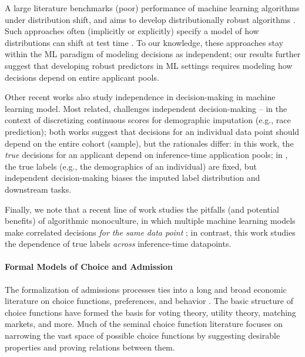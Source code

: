 \documentclass[letterpaper]{article}
\begin{document}
A large literature benchmarks (poor) performance of machine learning algorithms under distribution shift, and aims to develop distributionally robust algorithms \citep{gardner2023benchmarking,koh2021wilds,yao2022wild}. Such approaches often (implicitly or explicitly) specify a model of how distributions can shift at test time \cite{kaurmodeling}. To our knowledge, these approaches stay within the ML paradigm of modeling decisions as independent; our results further suggest that developing robust predictors in ML settings requires modeling how decisions depend on entire applicant pools.

Other recent works also study independence in decision-making in machine learning model. Most related, \citet{dongdiscretization2025} challenges independent decision-making -- in the context of discretizing continuous scores for demographic imputation (e.g., race prediction); both works suggest that decisions for an individual data point should depend on the entire cohort (sample), but the rationales differ: in this work, the \textit{true} decisions for an applicant depend on inference-time application pools; in \citet{dongdiscretization2025}, the true labels (e.g., the demographics of an individual) are fixed, but independent decision-making biases the imputed label distribution and downstream tasks.

Finally, we note that a recent line of work studies the pitfalls (and potential benefits) of algorithmic monoculture, in which multiple machine learning models make correlated decisions \textit{for the same data point} \cite{kleinberg2021algorithmic,bommasani2022pickingpersondoesalgorithmic, creel2022algorithmic, toups2023ecosystem, jain2023algorithmic,peng2024monoculture,peng2024wisdomfoolishnessnoisymatching, jain2024scarce,kim2025correlated}; in contrast, this work studies the dependence of true labels \textit{across} inference-time datapoints.

\paragraph{Formal Models of Choice and Admission}
The formalization of admissions processes ties into a long and broad economic literature on choice functions, preferences, and behavior \citep{arrow1959rational,sen1971choice,moulin1985choice,kalai2002rationalizing}. The basic structure of choice functions have formed the basis for voting theory, utility theory, matching markets, and more.
Much of the seminal choice function literature focuses on narrowing the vast space of possible choice functions by suggesting desirable properties and proving relations between them.
\end{document}
